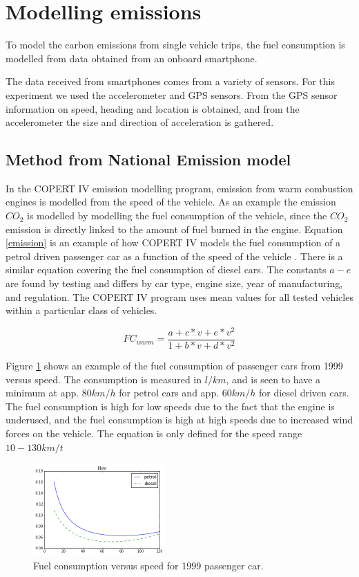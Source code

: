 \section{Modelling emissions}

To model the carbon emissions from single vehicle trips, the fuel consumption is modelled from data obtained from an onboard smartphone.
\label{sec:modeling}

The data received from smartphones comes from a variety of sensors. For this experiment we used the accelerometer and GPS sensors. From the GPS sensor information on speed, heading and location is obtained, and from the accelerometer the size and direction of acceleration is gathered.

\subsection{Method from National Emission model}

In the COPERT IV emission modelling program, emission from warm combustion engines is modelled from the speed of the vehicle. As an example the emission $CO_2$ is modelled by modelling the fuel consumption of the vehicle, since the $CO_2$ emission is directly linked to the amount of fuel burned in the engine. Equation \ref{emission} is an example of how COPERT IV models the fuel consumption of a petrol driven passenger car as a function of the speed of the vehicle \cite{Ntziachristos2012}. There is a similar equation covering the fuel consumption of diesel cars. The constants $a-e$ are found by testing and differs by car type, engine size, year of manufacturing, and regulation. The COPERT IV program uses mean values for all tested vehicles within a particular class of vehicles.

\begin{equation}
	FC_{warm} = \frac{a + c*v + e*v^2}{1 + b*v + d*v^2}
	\label{emission}
\end{equation}

Figure \ref{FC} shows an example of the fuel consumption of passenger cars from 1999 versus speed. The consumption is measured in $l/km$, and is seen to have a minimum at app. $80 km/h$ for petrol cars and app. $60 km/h$ for diesel driven cars. The fuel consumption is high for low speeds due to the fact that the engine is underused, and the fuel consumption is high at high speeds due to increased wind forces on the vehicle. The equation is only defined for the speed range $10 - 130 km/t$
 
\begin{figure}[h]
	\centering
  \includegraphics[width=0.45\textwidth]{fc_dieselpetrol}
  \caption{Fuel consumption versus speed for 1999 passenger car.}
  \label{FC}
\end{figure}

